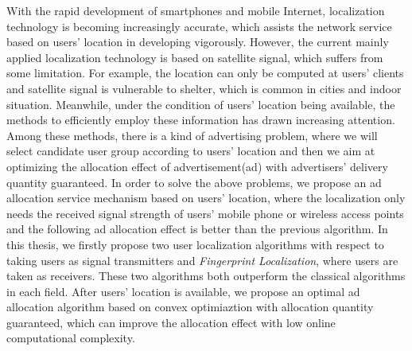 \begin{eabstract}
   With the rapid development of smartphones and mobile Internet, localization technology is becoming increasingly accurate, which assists the network service based on users' location in developing vigorously. However, the current mainly applied localization technology is based on satellite signal, which suffers from some limitation. For example, the location can only be computed at users' clients and satellite signal is vulnerable to shelter, which is common in cities and indoor situation. Meanwhile, under the condition of users' location being available, the methods to efficiently employ these information  has drawn increasing attention. Among these methods, there is a kind of advertising problem, where we will select candidate user group according to users' location and then we aim at optimizing the allocation effect of advertisement(ad) with advertisers' delivery quantity guaranteed. In order to solve the above problems, we propose an ad allocation service mechanism based on users' location, where the localization only needs the received signal strength of users' mobile phone or wireless access points and the following ad allocation effect is better than the previous algorithm. In this thesis, we firstly propose two user localization algorithms with respect to taking users as signal transmitters and \textit{Fingerprint Localization}, where users are taken as receivers. These two algorithms both outperform the classical algorithms in each field. After users' location is available, we propose an optimal ad allocation algorithm based on convex optimiaztion with allocation quantity guaranteed, which can improve the allocation effect with low online computational complexity. 
   

\end{eabstract}
